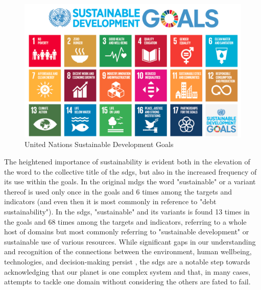 \begin{figure}[!htb]
	\centering
	\includegraphics[scale=0.25]{Figures/chap2/SDG.png}
	\caption[United Nations Sustainable Development Goals]{United Nations Sustainable Development Goals}
	\label{fig:sdgs}
\end{figure}

The heightened importance of sustainability is evident both in the elevation of the word to the collective title of the \acp{sdg}, but also in the increased frequency of its use within the goals. In the original \acp{mdg} the word "sustainable" or a variant thereof is used only once in the goals and 6 times among the targets and indicators (and even then it is most commonly in reference to "debt sustainability"). In the \acp{sdg}, "sustainable" and its variants is found 13 times in the goals and 68 times among the targets and indicators, referring to a whole host of domains but most commonly referring to "sustainable development" or sustainable use of various resources. While significant gaps in our understanding and recognition of the connections between the environment, human wellbeing, technologies, and decision-making persist \cite{bennichDecipheringScientificLiterature2020}, the \acp{sdg} are a notable step towards acknowledging that our planet is one complex system and that, in many cases, attempts to tackle one domain without considering the others are fated to fail. 

